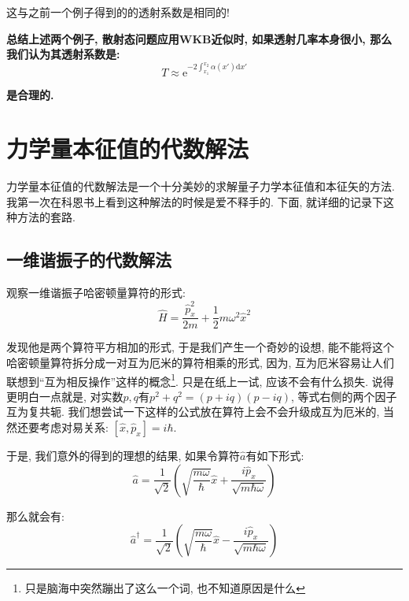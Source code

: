 \documentclass[a4paper, 11pt]{article}
\begin{document}
\begin{spacing}{1.2}
        这与之前一个例子得到的的透射系数是相同的!

        \textbf{总结上述两个例子, 散射态问题应用WKB近似时, 如果透射几率本身很小, 那么我们认为其透射系数是:}
        \begin{equation}
          T \approx \mathrm{e}^{-2\int_{x_1}^{x_2}\alpha(x')\mathrm{d}x'}
        \end{equation}

        \textbf{是合理的.}
    \section{力学量本征值的代数解法}
      
      力学量本征值的代数解法是一个十分美妙的求解量子力学本征值和本征矢的方法. 我第一次在科恩书上看到这种解法的时候是爱不释手的. 
      下面, 就详细的记录下这种方法的套路. 
      
      \subsection{一维谐振子的代数解法}
      
        观察一维谐振子哈密顿量算符的形式:
        \begin{equation}
          \hat{H} = \dfrac{\hat{p}_x^2}{2m} + \dfrac{1}{2}m\omega^2\hat{x}^2
        \end{equation}

        发现他是两个算符平方相加的形式, 于是我们产生一个奇妙的设想, 能不能将这个哈密顿量算符拆分成一对互为厄米的算符相乘的形式, 
        因为, 互为厄米容易让人们联想到``互为相反操作''这样的概念\footnote{只是脑海中突然蹦出了这么一个词, 也不知道原因是什么}. 
        只是在纸上一试, 应该不会有什么损失. 说得更明白一点就是, 对实数$p, q$有$p^2+q^2=(p+iq)(p-iq)$, 等式右侧的两个因子互为复共轭.
        我们想尝试一下这样的公式放在算符上会不会升级成互为厄米的, 当然还要考虑对易关系:
         $\left[\hat{x}, \hat{p}_x\right] = i\hbar$.

        于是, 我们意外的得到的理想的结果, 如果令算符$\hat{a}$有如下形式: 
        \begin{equation}
          \label{4120:a}
          \hat{a} = \dfrac{1}{\sqrt{2}}\left(\sqrt{\dfrac{m\omega}{\hbar}}\hat{x}+%
                    \dfrac{i\hat{p}_x}{\sqrt{m\hbar\omega}}\right)
        \end{equation}

        那么就会有:
        \begin{equation}
          \label{4120:adagger}
          \hat{a}^{\dagger} = \dfrac{1}{\sqrt{2}}\left(\sqrt{\dfrac{m\omega}{\hbar}}\hat{x}-%
                              \dfrac{i\hat{p}_x}{\sqrt{m\hbar\omega}}\right)
        \end{equation}
        

\end{spacing}
\end{document}
